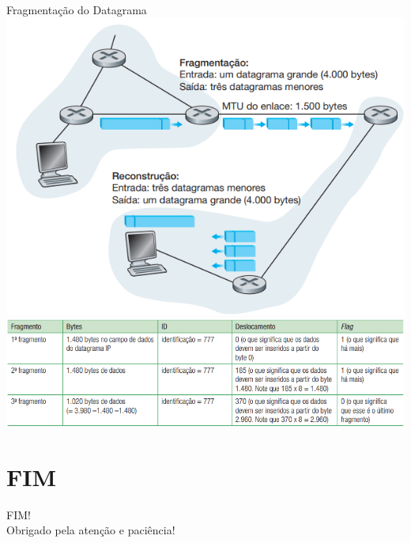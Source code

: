 \documentclass{libs/ufc_format}
\begin{document}
\begin{frame}{Fragmentação do Datagrama}
\centering
\includegraphics[scale=0.35]{figuras/figura10_02}\\
\includegraphics[scale=0.45]{figuras/figura10_03}
\end{frame}

\section{FIM}

\begin{frame}{}
    \centering
    \Large
    FIM!\\
    Obrigado pela atenção e paciência!
\end{frame}

\end{document}
